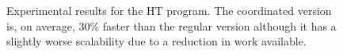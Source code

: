 \begin{figure}[ht!]
   \begin{center}
   \end{center}
   \caption{Experimental results for the HT program. The coordinated version
      is, on average, 30\% faster than the regular version although it has a
      slightly worse scalability due to a reduction in work available.}
   \label{results:ht}
\end{figure}
